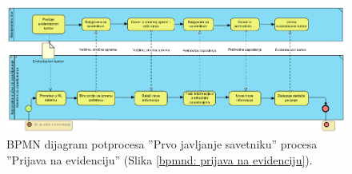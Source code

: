 \begin{mylandscape}
	\newpage
	
	\begin{figure}[H]
		\centering
		\includegraphics[width=0.8\paperwidth]{dijagrami/bpmn-dijagrami/prvo-javljanje-kod-savetnika.png}
		\caption{BPMN dijagram potprocesa ''Prvo javljanje savetniku'' procesa ''Prijava na evidenciju''  (Slika \ref{bpmnd: prijava na evidenciju}).}
	\end{figure}
\end{mylandscape}